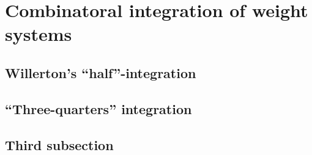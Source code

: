 \chapter{Combinatoral integration of weight systems}
\label{ch:combinatorial-integration_of_weight_systems}

\section{Willerton's ``half''-integration}

\section{``Three-quarters'' integration}

\section{Third subsection}
